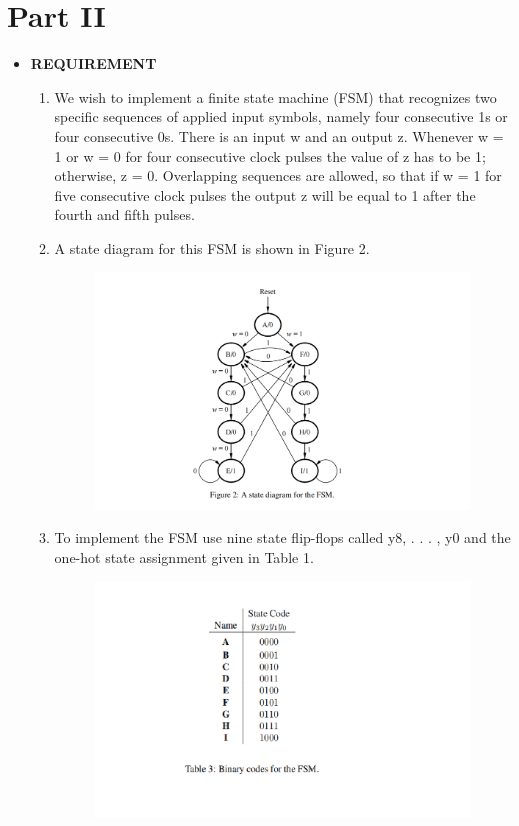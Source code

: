 \section{Part II}
\begin{itemize}
    \item []\textbf{REQUIREMENT}
        \begin{enumerate}
            \item We wish to implement a finite state machine (FSM) that recognizes two specific sequences of applied input symbols, namely four consecutive 1s or four consecutive 0s. There is an input w and an output z. Whenever w = 1 or w = 0 for four consecutive clock pulses the value of z has to be 1; otherwise, z = 0. Overlapping sequences are allowed, so that if w = 1 for five consecutive clock pulses the output z will be equal to 1 after the fourth and fifth pulses.
            \item A state diagram for this FSM is shown in Figure 2. 
                \begin{figure}[h]
                    \centering
                    \includegraphics[scale = 0.45]{source/picture/Lab7/minh_hoa_2.png}
                \end{figure}
            \item To implement the FSM use nine state flip-flops called y8, . . . , y0 and the one-hot state assignment given in Table 1.
                \begin{figure}[h]
                    \centering
                    \includegraphics[scale = 0.45]{source/picture/Lab7/minh_hoa_3.png}

\end{figure}
\end{enumerate}
\end{itemize}
